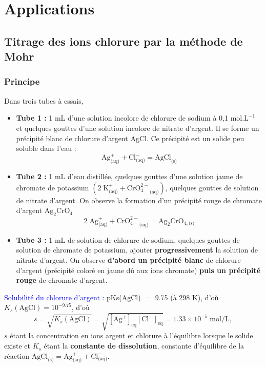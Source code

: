 \documentclass[11pt,a4paper]{report}
\begin{document}
\section{Applications}

\subsection{Titrage des ions chlorure par la méthode de Mohr}

\subsubsection*{Principe}

Dans trois tubes à essais,
\begin{itemize}
	\item \textbf{Tube 1 :} 1 mL d'une solution incolore de chlorure de sodium à 0,1 mol.$\text{L}^{-1}$ 			et quelques gouttes d'une solution incolore de nitrate d'argent. Il se forme un précipité 					blanc de chlorure d'argent AgCl. Ce précipité est un solide peu soluble dans l'eau :
		\begin{equation}
			\boxed{\text{Ag}^+_\text{(aq)} + \text{Cl}^-_\text{(aq)} = \text{AgCl}_\text{(s)}}
		\end{equation}
		
	\item \textbf{Tube 2 :} 1 mL d’eau distillée, quelques gouttes d'une solution jaune de 
		chromate de potassium $(2\;\text{K}^+_\text{(aq)}+{\text{CrO}_4^{2-}}_\text{(aq)})$,
		quelques gouttes de solution de nitrate d'argent. On observe la formation d'un précipité 					rouge de chromate d'argent $\text{Ag}_2\text{CrO}_4$
		\begin{equation}
			\boxed{2\;\text{Ag}^+_\text{(aq)} + {\text{CrO}_4^{2-}}_\text{(aq)} 
			= \text{Ag}_2\text{CrO}_{4,\text{(s)}}}
		\end{equation}
		
	\item \textbf{Tube 3 :} 1 mL de solution de chlorure de sodium, quelques gouttes de solution de 				chromate de potassium, ajouter \textbf{progressivement} la solution de nitrate d'argent.
		On observe \textbf{d'abord un précipité blanc} de chlorure d'argent (précipité coloré en jaune dû 		aux ions chromate) \textbf{puis un précipité rouge} de chromate d'argent.\\
\end{itemize}
	
\textcolor{blue}{Solubilité du chlorure d'argent :} 
	pKs(AgCl) $=$ 9.75 (à 298 K), d'où $K_s(\text{AgCl}) = 10^{-9.75}$, d'où
\begin{equation}
	s = \sqrt{K_s(\text{AgCl})} = \sqrt{[\text{Ag}^+]_\text{eq}[\text{Cl}^-]_\text{eq}}
	= 1.33\times10^{-5}\;\text{mol/L},
\end{equation}
$s$ étant la concentration en ions argent et chlorure à l'équilibre lorsque le solide existe et
$K_s$ étant la \textbf{constante de dissolution}, constante d'équilibre de la réaction
$\text{AgCl}_\text{(s)} = \text{Ag}^+_\text{(aq)} + \text{Cl}^-_\text{(aq)}$.
\end{document}
